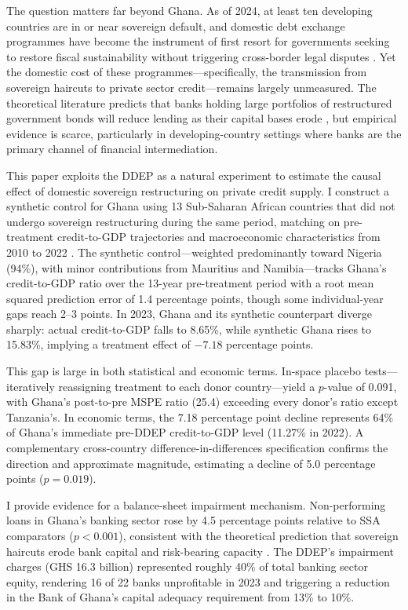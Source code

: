 \documentclass[12pt]{article}
\begin{document}
The question matters far beyond Ghana. As of 2024, at least ten developing countries are in or near sovereign default, and domestic debt exchange programmes have become the instrument of first resort for governments seeking to restore fiscal sustainability without triggering cross-border legal disputes \citep{reinhart2011forgotten, cruces2013sovereign}. Yet the domestic cost of these programmes---specifically, the transmission from sovereign haircuts to private sector credit---remains largely unmeasured. The theoretical literature predicts that banks holding large portfolios of restructured government bonds will reduce lending as their capital bases erode \citep{gennaioli2018sovereign, bolton2011sovereign, bocola2016lending}, but empirical evidence is scarce, particularly in developing-country settings where banks are the primary channel of financial intermediation.

This paper exploits the DDEP as a natural experiment to estimate the causal effect of domestic sovereign restructuring on private credit supply. I construct a synthetic control for Ghana using 13 Sub-Saharan African countries that did not undergo sovereign restructuring during the same period, matching on pre-treatment credit-to-GDP trajectories and macroeconomic characteristics from 2010 to 2022 \citep{abadie2010synthetic, abadie2015comparative, abadie2021synth}. The synthetic control---weighted predominantly toward Nigeria (94\%), with minor contributions from Mauritius and Namibia---tracks Ghana's credit-to-GDP ratio over the 13-year pre-treatment period with a root mean squared prediction error of 1.4 percentage points, though some individual-year gaps reach 2--3 points. In 2023, Ghana and its synthetic counterpart diverge sharply: actual credit-to-GDP falls to 8.65\%, while synthetic Ghana rises to 15.83\%, implying a treatment effect of $-7.18$ percentage points.

This gap is large in both statistical and economic terms. In-space placebo tests---iteratively reassigning treatment to each donor country---yield a $p$-value of 0.091, with Ghana's post-to-pre MSPE ratio (25.4) exceeding every donor's ratio except Tanzania's. In economic terms, the 7.18 percentage point decline represents 64\% of Ghana's immediate pre-DDEP credit-to-GDP level (11.27\% in 2022). A complementary cross-country difference-in-differences specification confirms the direction and approximate magnitude, estimating a decline of 5.0 percentage points ($p = 0.019$).

I provide evidence for a balance-sheet impairment mechanism. Non-performing loans in Ghana's banking sector rose by 4.5 percentage points relative to SSA comparators ($p < 0.001$), consistent with the theoretical prediction that sovereign haircuts erode bank capital and risk-bearing capacity \citep{gennaioli2018sovereign}. The DDEP's impairment charges (GHS 16.3 billion) represented roughly 40\% of total banking sector equity, rendering 16 of 22 banks unprofitable in 2023 and triggering a reduction in the Bank of Ghana's capital adequacy requirement from 13\% to 10\%.
\end{document}
